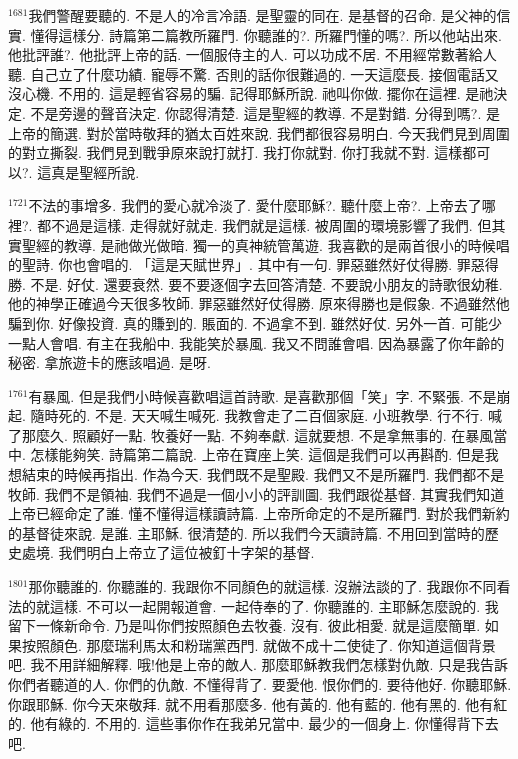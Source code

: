 \documentclass{book}
\begin{document}
$^{1681}$我們警醒要聽的.
不是人的冷言冷語.
是聖靈的同在.
是基督的召命.
是父神的信實.
懂得這樣分.
詩篇第二篇教所羅門.
你聽誰的?.
所羅門懂的嗎?.
所以他站出來.
他批評誰?.
他批評上帝的話.
一個服侍主的人.
可以功成不居.
不用經常數著給人聽.
自己立了什麼功績.
寵辱不驚.
否則的話你很難過的.
一天這麼長.
接個電話又沒心機.
不用的.
這是輕省容易的騙.
記得耶穌所說.
祂叫你做.
擺你在這裡.
是祂決定.
不是旁邊的聲音決定.
你認得清楚.
這是聖經的教導.
不是對錯.
分得到嗎?.
是上帝的簡選.
對於當時敬拜的猶太百姓來說.
我們都很容易明白.
今天我們見到周圍的對立撕裂.
我們見到戰爭原來說打就打.
我打你就對.
你打我就不對.
這樣都可以?.
這真是聖經所說.

$^{1721}$不法的事增多.
我們的愛心就冷淡了.
愛什麼耶穌?.
聽什麼上帝?.
上帝去了哪裡?.
都不過是這樣.
走得就好就走.
我們就是這樣.
被周圍的環境影響了我們.
但其實聖經的教導.
是祂做光做暗.
獨一的真神統管萬遊.
我喜歡的是兩首很小的時候唱的聖詩.
你也會唱的.
「這是天賦世界」.
其中有一句.
罪惡雖然好仗得勝.
罪惡得勝.
不是.
好仗.
還要衰然.
要不要逐個字去回答清楚.
不要說小朋友的詩歌很幼稚.
他的神學正確過今天很多牧師.
罪惡雖然好仗得勝.
原來得勝也是假象.
不過雖然他騙到你.
好像投資.
真的賺到的.
賬面的.
不過拿不到.
雖然好仗.
另外一首.
可能少一點人會唱.
有主在我船中.
我能笑於暴風.
我又不問誰會唱.
因為暴露了你年齡的秘密.
拿旅遊卡的應該唱過.
是呀.

$^{1761}$有暴風.
但是我們小時候喜歡唱這首詩歌.
是喜歡那個「笑」字.
不緊張.
不是崩起.
隨時死的.
不是.
天天喊生喊死.
我教會走了二百個家庭.
小班教學.
行不行.
喊了那麼久.
照顧好一點.
牧養好一點.
不夠奉獻.
這就要想.
不是拿無事的.
在暴風當中.
怎樣能夠笑.
詩篇第二篇說.
上帝在寶座上笑.
這個是我們可以再斟酌.
但是我想結束的時候再指出.
作為今天.
我們既不是聖殿.
我們又不是所羅門.
我們都不是牧師.
我們不是領袖.
我們不過是一個小小的評訓圖.
我們跟從基督.
其實我們知道上帝已經命定了誰.
懂不懂得這樣讀詩篇.
上帝所命定的不是所羅門.
對於我們新約的基督徒來說.
是誰.
主耶穌.
很清楚的.
所以我們今天讀詩篇.
不用回到當時的歷史處境.
我們明白上帝立了這位被釘十字架的基督.

$^{1801}$那你聽誰的.
你聽誰的.
我跟你不同顏色的就這樣.
沒辦法談的了.
我跟你不同看法的就這樣.
不可以一起開報道會.
一起侍奉的了.
你聽誰的.
主耶穌怎麼說的.
我留下一條新命令.
乃是叫你們按照顏色去牧養.
沒有.
彼此相愛.
就是這麼簡單.
如果按照顏色.
那麼瑞利馬太和粉瑞黨西門.
就做不成十二使徒了.
你知道這個背景吧.
我不用詳細解釋.
哦!他是上帝的敵人.
那麼耶穌教我們怎樣對仇敵.
只是我告訴你們者聽道的人.
你們的仇敵.
不懂得背了.
要愛他.
恨你們的.
要待他好.
你聽耶穌.
你跟耶穌.
你今天來敬拜.
就不用看那麼多.
他有黃的.
他有藍的.
他有黑的.
他有紅的.
他有綠的.
不用的.
這些事你作在我弟兄當中.
最少的一個身上.
你懂得背下去吧.
\end{document}
